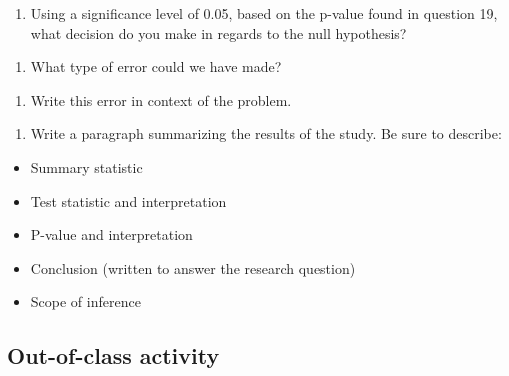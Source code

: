 \documentclass[
]{report}
\providecommand{\tightlist}{%
  \setlength{\itemsep}{0pt}\setlength{\parskip}{0pt}}
\begin{document}
\begin{enumerate}
\def\labelenumi{\arabic{enumi}.}
\setcounter{enumi}{22}
\tightlist
\item
  Using a significance level of 0.05, based on the p-value found in question 19, what decision do you make in regards to the null hypothesis?
\end{enumerate}

\vspace{0.5in}

\begin{enumerate}
\def\labelenumi{\arabic{enumi}.}
\setcounter{enumi}{23}
\tightlist
\item
  What type of error could we have made?
\end{enumerate}

\vspace{0.5in}

\begin{enumerate}
\def\labelenumi{\arabic{enumi}.}
\setcounter{enumi}{24}
\tightlist
\item
  Write this error in context of the problem.
\end{enumerate}

\vspace{1in}

\begin{enumerate}
\def\labelenumi{\arabic{enumi}.}
\setcounter{enumi}{25}
\tightlist
\item
  Write a paragraph summarizing the results of the study. Be sure to describe:
\end{enumerate}

\begin{itemize}
\item
  Summary statistic
\item
  Test statistic and interpretation
\item
  P-value and interpretation
\item
  Conclusion (written to answer the research question)
\item
  Scope of inference
\end{itemize}

\vspace{2in}

\hypertarget{out-of-class-activity-7}{%
\subsection{Out-of-class activity}\label{out-of-class-activity-7}}
\end{document}
